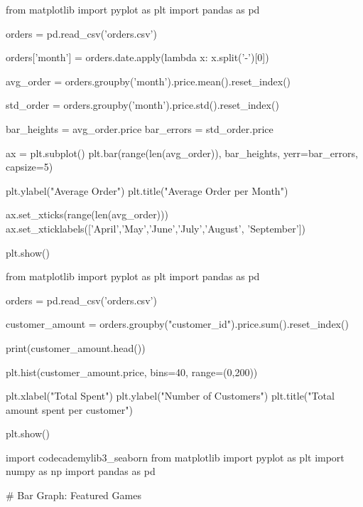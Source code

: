 \documentclass{journal}
\begin{document}
from matplotlib import pyplot as plt
import pandas as pd

orders = pd.read_csv('orders.csv')

orders['month'] = orders.date.apply(lambda x: x.split('-')[0])

avg_order = orders.groupby('month').price.mean().reset_index()

std_order = orders.groupby('month').price.std().reset_index()

bar_heights = avg_order.price
bar_errors = std_order.price


ax = plt.subplot()
plt.bar(range(len(avg_order)), bar_heights, yerr=bar_errors, capsize=5)

plt.ylabel("Average Order")
plt.title("Average Order per Month")

ax.set_xticks(range(len(avg_order)))
ax.set_xticklabels(['April','May','June','July','August', 'September'])

plt.show()











from matplotlib import pyplot as plt
import pandas as pd

orders = pd.read_csv('orders.csv')

customer_amount = orders.groupby("customer_id").price.sum().reset_index()

print(customer_amount.head())

plt.hist(customer_amount.price, bins=40, range=(0,200))

plt.xlabel("Total Spent")
plt.ylabel("Number of Customers")
plt.title("Total amount spent per customer")

plt.show()



























import codecademylib3_seaborn
from matplotlib import pyplot as plt
import numpy as np
import pandas as pd

# Bar Graph: Featured Games
\end{document}
